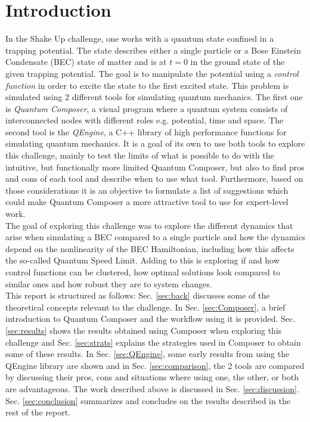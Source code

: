 \documentclass[a4paper, twocolumn]{revtex4-1}
\begin{document}
\section{Introduction}
In the Shake Up challenge, one works with a quantum state confined in a trapping potential. The state describes either a single particle or a Bose Einstein Condensate (BEC) state of matter and is at $t=0$ in the ground state of the given trapping potential. The goal is to manipulate the potential using a \textit{control function} in order to excite the state to the first excited state. This problem is simulated using 2 different tools for simulating quantum mechanics. The first one is \textit{Quantum Composer}, a visual program where a quantum system consists of interconnected nodes with different roles e.g. potential, time and space. The second tool is the \textit{QEngine}, a C++ library of high performance functions for simulating quantum mechanics. It is a goal of its own to use both tools to explore this challenge, mainly to test the limits of what is possible to do with the intuitive, but functionally more limited Quantum Composer, but also to find pros and cons of each tool and describe when to use what tool. Furthermore, based on those considerations it is an objective to formulate a list of suggestions which could make Quantum Composer a more attractive tool to use for expert-level work.\\

The goal of exploring this challenge was to explore the different dynamics that arise when simulating a BEC compared to a single particle and how the dynamics depend on the nonlinearity of the BEC Hamiltonian, including how this affects the so-called Quantum Speed Limit. Adding to this is exploring if and how control functions can be clustered, how optimal solutions look compared to similar ones and how robust they are to system changes.\\

This report is structured as follows: Sec. \ref{sec:back} discusses some of the theoretical concepts relevant to the challenge. In Sec. \ref{sec:Composer}, a brief introduction to Quantum Composer and the workflow using it is provided. Sec. \ref{sec:results} shows the results obtained using Composer when exploring this challenge and Sec. \ref{sec:strats} explains the strategies used in Composer to obtain some of these results. In Sec. \ref{sec:QEngine}, some early results from using the QEngine library are shown and in Sec. \ref{sec:comparison}, the 2 tools are compared by discussing their pros, cons and situations where using one, the other, or both are advantageous. The work described above is discussed in Sec. \ref{sec:discussion}. Sec. \ref{sec:conclusion} summarizes and concludes on the results described in the rest of the report.
\end{document}
